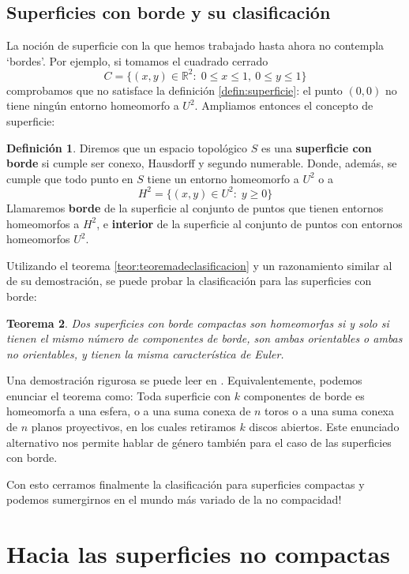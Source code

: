 \documentclass[a4paper,11pt,spanish, twoside, leqno]{tfg-uam}
\newcommand*{\reales}{\mathbb{R}}
\newtheorem{teor}{Teorema}[chapter]
\theoremstyle{definition}
\newtheorem{defin}[teor]{Definici\'on}
\begin{document}
\section{Superficies con borde y su clasificación}
\label{sec:superfborde}
La noción de superficie con la que hemos trabajado hasta ahora no contempla `bordes'. Por ejemplo, si tomamos el cuadrado cerrado
\[
C = \{(x,y)\in \reales^2:\; 0 \leq x \leq 1, \: 0 \leq y \leq 1  \}
\]
comprobamos que no satisface la definición \ref{defin:superficie}: el punto $(0,0)$ no tiene ningún entorno homeomorfo a $U^2$. Ampliamos entonces el concepto de superficie:

\begin{defin}
Diremos que un espacio topológico $S$ es una \textbf{superficie con borde} si cumple ser conexo, Hausdorff y segundo numerable. Donde, además, se cumple que todo punto en $S$ tiene un entorno homeomorfo a $U^2$ o a
\[H^2 = \{(x,y)\in U^2:\; y\geq0 \}\]
Llamaremos \textbf{borde} de la superficie al conjunto de puntos que tienen entornos homeomorfos a $H^2$, e \textbf{interior} de la superficie al conjunto de puntos con entornos homeomorfos $U^2$.
\end{defin}

Utilizando el teorema \ref{teor:teoremadeclasificacion} y un razonamiento similar al de su demostración, se puede probar la clasificación para las superficies con borde:

\begin{teor}
Dos superficies con borde compactas son homeomorfas si y solo si tienen el mismo número de componentes de borde, son ambas orientables o ambas no orientables, y tienen la misma característica de Euler.
\end{teor}

Una demostración rigurosa se puede leer en \cite{massey}. Equivalentemente, podemos enunciar el teorema como: Toda superficie con $k$ componentes de borde es homeomorfa a una esfera, o a una suma conexa de $n$ toros o a una suma conexa de $n$ planos proyectivos, en los cuales retiramos $k$ discos abiertos. Este enunciado alternativo nos permite hablar de género también para el caso de las superficies con borde. 

Con esto cerramos finalmente la clasificación para superficies compactas y  podemos sumergirnos en el mundo más variado de la no compacidad!



\chapter{Hacia las superficies no compactas}
\end{document}
